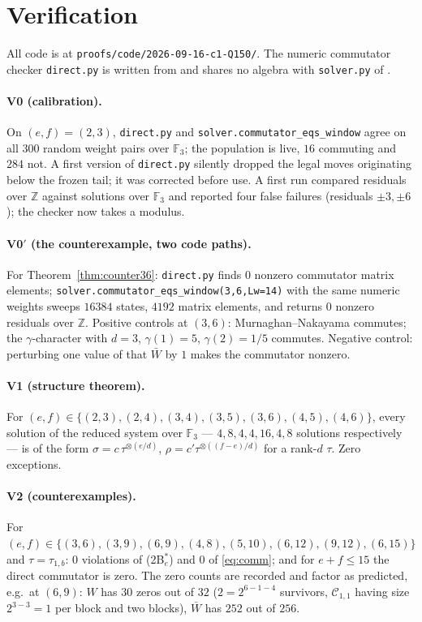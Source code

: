 \documentclass[11pt]{article}
\theoremstyle{definition}
\theoremstyle{remark}
\newcommand{\Z}{\mathbb{Z}}
\newcommand{\F}{\mathbb{F}}
\newcommand{\Cset}{\mathcal{C}}
\begin{document}
\section{Verification}\label{sec:ver}

All code is at \texttt{proofs/code/2026-09-16-c1-Q150/}.  The numeric commutator checker
\texttt{direct.py} is written from \cite[Conv.~1.2]{Q149} and shares no algebra with
\texttt{solver.py} of \cite{Q149}.

\paragraph{V0 (calibration).}  On $(e,f)=(2,3)$, \texttt{direct.py} and
\texttt{solver.commutator\_eqs\_window} agree on all $300$ random weight pairs over
$\F_3$; the population is live, $16$ commuting and $284$ not.  A first version of
\texttt{direct.py} silently dropped the legal moves originating below the frozen tail; it
was corrected before use.  A first run compared residuals over $\Z$ against solutions over
$\F_3$ and reported four false failures (residuals $\pm3,\pm6$); the checker now takes a
modulus.

\paragraph{V0$'$ (the counterexample, two code paths).}  For
Theorem~\ref{thm:counter36}: \texttt{direct.py} finds $0$ nonzero commutator matrix
elements; \texttt{solver.commutator\_eqs\_window(3,6,Lw=14)} with the same numeric weights
sweeps $16384$ states, $4192$ matrix elements, and returns $0$ nonzero residuals over $\Z$.
Positive controls at $(3,6)$: Murnaghan--Nakayama commutes; the $\gamma$-character with
$d=3$, $\gamma(1)=5$, $\gamma(2)=1/5$ commutes.  Negative control: perturbing one value of
that $\bar W$ by $1$ makes the commutator nonzero.

\paragraph{V1 (structure theorem).}  For $(e,f)\in\{(2,3),(2,4),(3,4),(3,5),(3,6),(4,5),
(4,6)\}$, every solution of the reduced system over $\F_3$ --- $4,8,4,4,16,4,8$ solutions
respectively --- is of the form $\sigma=c\,\tau^{\otimes(e/d)}$,
$\rho=c'\tau^{\otimes((f-e)/d)}$ for a rank-$d$ $\tau$.  Zero exceptions.

\paragraph{V2 (counterexamples).}  For $(e,f)\in\{(3,6),(3,9),(6,9),(4,8),(5,10),(6,12),
(9,12),(6,15)\}$ and $\tau=\tau_{1,b}$: $0$ violations of (2B$^*_e$) and $0$ of
\eqref{eq:comm}; and for $e+f\le15$ the direct commutator is zero.  The zero counts are
recorded and factor as predicted, e.g.\ at $(6,9)$: $W$ has $30$ zeros out of $32$
($2=2^{6-1-4}$ survivors, $\Cset_{1,1}$ having size $2^{3-3}=1$ per block and two blocks),
$\bar W$ has $252$ out of $256$.
\end{document}
